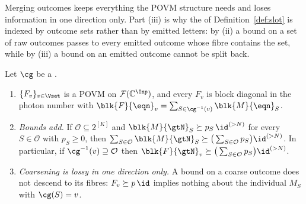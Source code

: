 
Merging outcomes keeps everything the POVM structure needs and loses
information in one direction only. Part (iii) is why the
 of Definition~\ref{def:slot} is indexed by
outcome sets rather than by emitted letters: by (ii) a bound on a set of raw
outcomes passes to every emitted outcome whose fibre contains the set, while
by (iii) a bound on an emitted outcome cannot be split back.

\begin{theorem}\label{thm:coarse-graining}
Let $\cg$ be a .
\begin{enumerate}[label=(\roman*),leftmargin=3.0em]
\item $\{F_v\}_{v\in\Vset}$ is a POVM on $\mathcal{F}(\mathbb{C}^{\Inp})$, and
  every $F_v$ is block diagonal in the photon number with
  $\blk{F}{\eqn}_v=\sum_{S\in\cg^{-1}(v)}\blk{M}{\eqn}_S$.
\item \emph{Bounds add.} If $\mathcal{O}\subseteq2^{[K]}$ and
  $\blk{M}{\gtN}_S\succeq p_S\,\id^{(>N)}$ for every $S\in\mathcal{O}$ with
  $p_S\ge0$, then
  $\sum_{S\in\mathcal{O}}\blk{M}{\gtN}_S\succeq
  \big(\sum_{S\in\mathcal{O}}p_S\big)\id^{(>N)}$. In particular, if
  $\cg^{-1}(v)\supseteq\mathcal{O}$ then
  $\blk{F}{\gtN}_v\succeq\big(\sum_{S\in\mathcal{O}}p_S\big)\id^{(>N)}$.
\item \emph{Coarsening is lossy in one direction only.} A bound on a coarse
  outcome does not descend to its fibres: $F_v\succeq p\,\id$ implies nothing
  about the individual $M_S$ with $\cg(S)=v$.
\end{enumerate}
\end{theorem}

